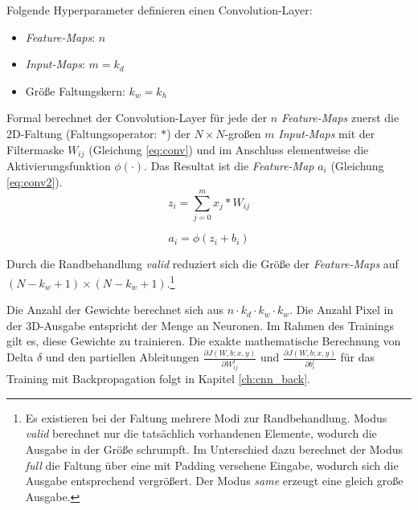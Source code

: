 Folgende Hyperparameter definieren einen Convolution-Layer:
\begin{itemize}
\item \textit{Feature-Maps}: $n$
\item \textit{Input-Maps}: $m = k_d$
\item Größe Faltungskern: $k_w = k_h$
\end{itemize}


Formal berechnet der Convolution-Layer für jede der $n$ \textit{Feature-Maps} zuerst die 2D-Faltung (Faltungsoperator: $\ast$) der $N \times N$-großen $m$ \textit{Input-Maps} mit der Filtermaske $W_{ij}$ (Gleichung \ref{eq:conv}) und im Anschluss elementweise die Aktivierungsfunktion $\phi(\cdot)$. Das Resultat ist die \textit{Feature-Map} $a_i$ (Gleichung \ref{eq:conv2}).
\begin{equation}
\label{eq:conv} 
z_i = \sum_{j=0}^{m}  x_{j} \ast W_{ij}
\end{equation}

\begin{equation}
\label{eq:conv2} 
a_{i} = \phi(z_{i} + b_i)
\end{equation}

Durch die Randbehandlung \textit{valid} reduziert sich die Größe der \textit{Feature-Maps} auf $(N - k_w + 1) \times (N - k_w + 1)$.\footnote{Es existieren bei der Faltung mehrere Modi zur Randbehandlung. Modus \textit{valid} berechnet nur die tatsächlich vorhandenen Elemente, wodurch die Ausgabe in der Größe schrumpft. Im Unterschied dazu berechnet der Modus \textit{full} die Faltung über eine mit Padding versehene Eingabe, wodurch sich die Ausgabe entsprechend vergrößert. Der Modus \textit{same} erzeugt eine gleich große Ausgabe.}

Die Anzahl der Gewichte berechnet sich aus $ n \cdot k_d \cdot k_w \cdot k_w$. Die Anzahl Pixel in der 3D-Ausgabe entspricht der Menge an Neuronen. Im Rahmen des Trainings gilt es, diese Gewichte zu trainieren. Die exakte mathematische Berechnung von Delta  $\delta$ und den partiellen Ableitungen $\frac{\partial J(W,b;x,y)}{\partial W_{ij}^l}$ und $\frac{\partial J(W,b;x,y)}{\partial b_i^l}$ für das Training mit Backpropagation folgt in Kapitel \ref{ch:cnn_back}.

